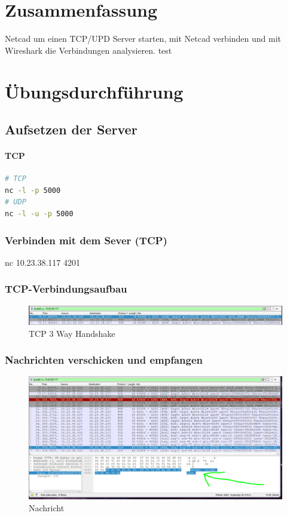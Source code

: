 \documentclass[a4paper]{article}
\begin{document}
\section{Zusammenfassung}
Netcad um einen TCP/UPD Server starten, mit Netcad verbinden und mit Wireshark die Verbindungen analysieren.
test


\newpage

\section{Übungsdurchführung}

\subsection{Aufsetzen der Server}
\paragraph{TCP}
\begin{lstlisting}[language=bash,caption={Commands}]
# TCP
nc -l -p 5000
# UDP
nc -l -u -p 5000
\end{lstlisting}

\subsubsection{Verbinden mit dem Sever (TCP)}
nc 10.23.38.117 4201
\subsubsection{TCP-Verbindungsaufbau}
\begin{figure}[h]
	\includegraphics[scale=0.3]{images/handshake.jpeg}
	\caption{TCP 3 Way Handshake}
\end{figure}
\subsubsection{Nachrichten verschicken und empfangen}
\begin{figure}[h]
	\includegraphics[scale=0.3]{images/nachricht.jpeg}
	\caption{Nachricht}
\end{figure}
\newpage
\end{document}
